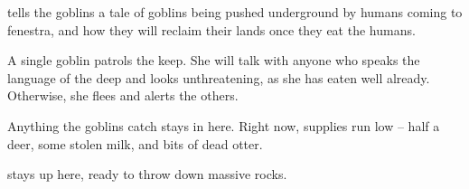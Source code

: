\begin{multicols}{2}



 tells the goblins a tale of goblins being pushed underground by humans coming to \gls{fenestra}, and how they will reclaim their lands once they eat the humans.


\goblin


A single goblin patrols the keep.
She will talk with anyone who speaks the language of the \gls{deep} and looks unthreatening, as she has eaten well already.
Otherwise, she flees and alerts the others.


Anything the goblins catch stays in here.
Right now, supplies run low -- half a deer, some stolen milk, and bits of dead otter.


 stays up here, ready to throw down massive rocks.

\end{multicols}

\begin{multicols}{2}


\columnbreak


\end{multicols}

